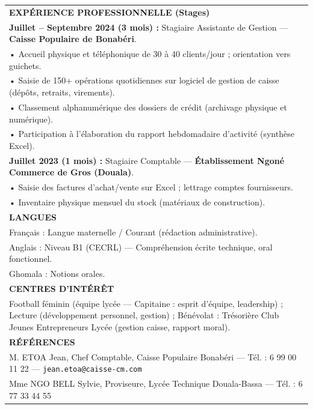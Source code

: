 \documentclass[11pt]{article}
\begin{document}
\begin{exoresolu}
\begin{center}
\begin{tabularx}{\linewidth}{|X|}
\textbf{EXPÉRIENCE PROFESSIONNELLE (Stages)} \\
\textbf{Juillet – Septembre 2024 (3 mois) :} Stagiaire Assistante de Gestion — \textbf{Caisse Populaire de Bonabéri}. \\
\hspace{0.5cm}• Accueil physique et téléphonique de 30 à 40 clients/jour ; orientation vers guichets. \\
\hspace{0.5cm}• Saisie de 150+ opérations quotidiennes sur logiciel de gestion de caisse (dépôts, retraits, virements). \\
\hspace{0.5cm}• Classement alphanumérique des dossiers de crédit (archivage physique et numérique). \\
\hspace{0.5cm}• Participation à l'élaboration du rapport hebdomadaire d'activité (synthèse Excel). \\
\textbf{Juillet 2023 (1 mois) :} Stagiaire Comptable — \textbf{Établissement Ngoné Commerce de Gros (Douala)}. \\
\hspace{0.5cm}• Saisie des factures d'achat/vente sur Excel ; lettrage comptes fournisseurs. \\
\hspace{0.5cm}• Inventaire physique mensuel du stock (matériaux de construction). \\ \hline
\textbf{LANGUES} \\
Français : Langue maternelle / Courant (rédaction administrative). \\
Anglais : Niveau B1 (CECRL) — Compréhension écrite technique, oral fonctionnel. \\
Ghomala : Notions orales. \\ \hline
\textbf{CENTRES D'INTÉRÊT} \\
Football féminin (équipe lycée — Capitaine : esprit d'équipe, leadership) ; Lecture (développement personnel, gestion) ; Bénévolat : Trésorière Club Jeunes Entrepreneurs Lycée (gestion caisse, rapport moral). \\ \hline
\textbf{RÉFÉRENCES} \\
M. ETOA Jean, Chef Comptable, Caisse Populaire Bonabéri — Tél. : 6 99 00 11 22 — \texttt{jean.etoa@caisse-cm.com} \\
Mme NGO BELL Sylvie, Proviseure, Lycée Technique Douala-Bassa — Tél. : 6 77 33 44 55 \\ \hline
\end{tabularx}
\end{center}


\end{exoresolu}
\end{document}
